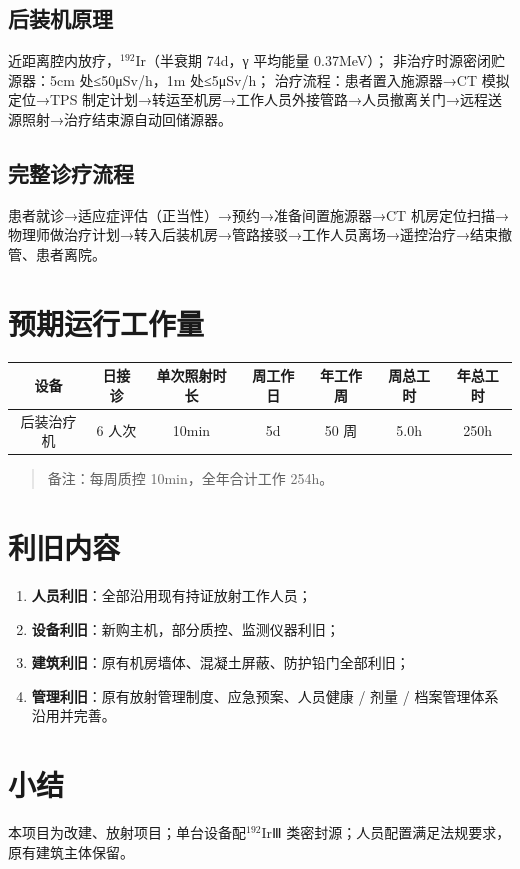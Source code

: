 \subsection{后装机原理}

近距离腔内放疗，$^{192}\text{Ir}$（半衰期 74d，γ 平均能量 0.37MeV）；
非治疗时源密闭贮源器：5cm 处≤50μSv/h，1m 处≤5μSv/h；
治疗流程：患者置入施源器→CT 模拟定位→TPS 制定计划→转运至机房→工作人员外接管路→人员撤离关门→远程送源照射→治疗结束源自动回储源器。

\subsection{完整诊疗流程}

患者就诊→适应症评估（正当性）→预约→准备间置施源器→CT 机房定位扫描→物理师做治疗计划→转入后装机房→管路接驳→工作人员离场→遥控治疗→结束撤管、患者离院。

\section{预期运行工作量}

\begin{table}[H]
\centering
\begin{tabular}{|c|c|c|c|c|c|c|}
\hline
设备 & 日接诊 & 单次照射时长 & 周工作日 & 年工作周 & 周总工时 & 年总工时 \\
\hline
后装治疗机 & 6 人次 & 10min & 5d & 50 周 & 5.0h & 250h \\
\hline
\end{tabular}
\end{table}


\begin{quote}
备注：每周质控 10min，全年合计工作 254h。
\end{quote}

\section{利旧内容}

\begin{enumerate}
\item \textbf{人员利旧}：全部沿用现有持证放射工作人员；
\item \textbf{设备利旧}：新购主机，部分质控、监测仪器利旧；
\item \textbf{建筑利旧}：原有机房墙体、混凝土屏蔽、防护铅门全部利旧；
\item \textbf{管理利旧}：原有放射管理制度、应急预案、人员健康 / 剂量 / 档案管理体系沿用并完善。
\end{enumerate}

\section{小结}

本项目为改建、\radiationhazarddegree 放射项目；单台设备配$^{192}\text{Ir}$Ⅲ 类密封源；人员配置满足法规要求，原有建筑主体保留。
